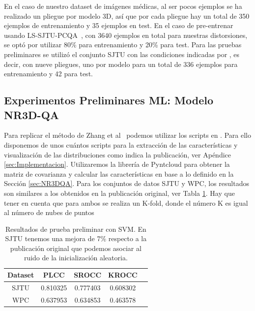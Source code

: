 En el caso de nuestro dataset de imágenes médicas, al ser pocos ejemplos 
se ha realizado un pliegue por modelo 3D, así que por cada pliegue hay un total de 
350 ejemplos de entrenamiento y 35 ejemplos en test. 
En el caso de pre-entrenar usando LS-SJTU-PCQA~\cite{ResSCNN}, con 3640 ejemplos en total para 
nuestras distorsiones, se optó por utilizar 80\% para entrenamiento y 20\% para test. 
Para las pruebas preliminares se utilizó el conjunto SJTU con las condiciones indicadas por 
\cite{VQA-PC}, es decir, con nueve pliegues, uno por modelo para un total de 336 ejemplos para entrenamiento y 42 para test. 


\subsection{Experimentos Preliminares ML: Modelo NR3D-QA}
Para replicar el método de Zhang et al~\cite{NR3DQA} podemos utilizar los 
scripts en . Para ello disponemos de unos cuántos scripts para la extracción de las características y visualización de las distribuciones 
como indica la publicación, ver Apéndice \ref{sec:Implementacion}. 
Utilizaremos la librería de Pyntcloud para obtener 
la matriz de covarianza y calcular las características en base a lo definido 
en la Sección \ref{sec:NR3DQA}.
Para los conjuntos de datos SJTU y WPC, los resultados 
son similares a los obtenidos en la publicación original, ver Tabla \ref{tab:PlainNR3DQA}.
Hay que tener en cuenta que para ambos se realiza un K-fold, donde el número 
K es igual al número de nubes de puntos 

\begin{table}[htp]
  \scriptsize
  \begin{center}
    \begin{tabular}[c]{|c|c|c|c|c|}
      \hline
      \rowcolor[HTML]{FFC702}
      \textbf{Dataset} & \textbf{PLCC} & \textbf{SROCC} & \textbf{KROCC} \\ 
      \hline
      SJTU & 0.810325 & 0.777403 & 0.608302 \\ 
      \hline 
      WPC & 0.637953 & 0.634853 & 0.463578 \\
      \hline
    \end{tabular}
  \end{center}
  \caption[Resultados de prueba preliminar con SVM.]{Resultados de prueba preliminar con SVM.
  En SJTU tenemos una mejora de 7\% respecto a la publicación original que podemos asociar al ruido de la inicialización aleatoria. }
  \label{tab:PlainNR3DQA}
\end{table}

